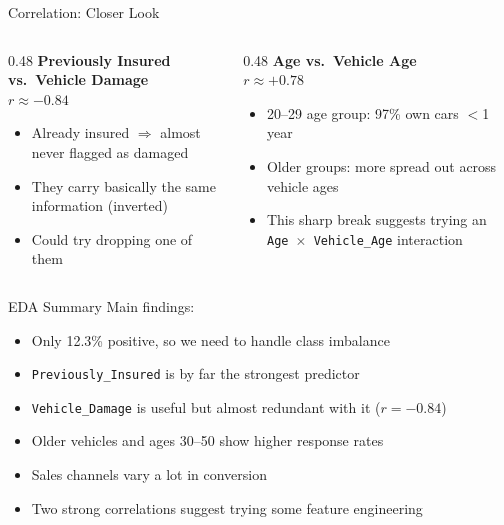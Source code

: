 \documentclass[aspectratio=169, 10pt]{beamer}
\begin{document}
\begin{frame}{Correlation: Closer Look}
  \begin{columns}[T]
    \begin{column}{0.48\textwidth}
      \textbf{Previously Insured vs.\ Vehicle Damage} \\[0.2cm]
      $r \approx -0.84$
      \begin{itemize}
        \item Already insured $\Rightarrow$ almost never flagged as damaged
        \item They carry basically the same information (inverted)
        \item Could try dropping one of them
      \end{itemize}
    \end{column}
    \begin{column}{0.48\textwidth}
      \textbf{Age vs.\ Vehicle Age} \\[0.2cm]
      $r \approx +0.78$
      \begin{itemize}
        \item 20--29 age group: 97\% own cars $<$1 year
        \item Older groups: more spread out across vehicle ages
        \item This sharp break suggests trying an \texttt{Age $\times$ Vehicle\_Age} interaction
      \end{itemize}
    \end{column}
  \end{columns}
\end{frame}

\begin{frame}{EDA Summary}
  Main findings:
  \begin{itemize}
    \item Only 12.3\% positive, so we need to handle class imbalance
    \item \texttt{Previously\_Insured} is by far the strongest predictor
    \item \texttt{Vehicle\_Damage} is useful but almost redundant with it ($r = -0.84$)
    \item Older vehicles and ages 30--50 show higher response rates
    \item Sales channels vary a lot in conversion
    \item Two strong correlations suggest trying some feature engineering
  \end{itemize}
\end{frame}
\end{document}
